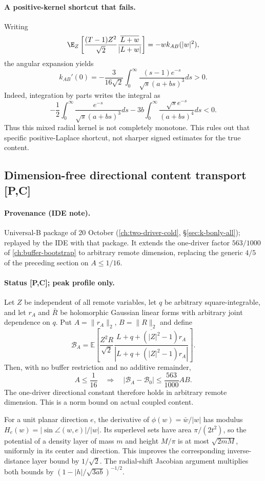 \paragraph{A positive-kernel shortcut that fails.}
Writing
\[
 \E_Z\left[\frac{(T-1)Z^2}{\sqrt2}
 \frac{\overline{L+w}}{|L+w|}\right]=-w k_{AB}(|w|^2),
\]
the angular expansion yields
\[
 k_{AB}'(0)=-\frac3{16\sqrt2}\int_0^\infty
 \frac{(s-1)e^{-s}}{\sqrt s(a+bs)^3}ds>0.
\]
Indeed, integration by parts writes the integral as
\[
 -\frac12\int_0^\infty\frac{e^{-s}}{\sqrt s(a+bs)^3}ds
 -3b\int_0^\infty\frac{\sqrt s e^{-s}}{(a+bs)^4}ds<0.
\]
Thus this mixed radial kernel is not completely monotone. This rules
out that specific positive-Laplace shortcut, not sharper signed
estimates for the true content.

\subsection{Dimension-free directional content transport [P,C]}\label{sec:directional-transport-dimfree}
\paragraph{Provenance (IDE note).} Universal-B package of 20 October (\autoref{ch:two-driver-cold}, \S\ref{sec:k-bonly-all}); replayed by the IDE with that package. It extends the one-driver factor $563/1000$ of \autoref{ch:buffer-bootstrap} to arbitrary remote dimension, replacing the generic $4/5$ of the preceding section on $A\le1/16$.
\paragraph{Status [P,C]; peak profile only.}
Let $Z$ be independent of all remote variables, let $q$ be arbitrary
square-integrable, and let $r_A$ and $\bar R$ be holomorphic Gaussian
linear forms with arbitrary joint dependence on $q$. Put
$A=\|r_A\|_2$, $B=\|R\|_2$ and define
\[
 \mathcal B_A=\mathbb E\left[\frac{Z^2R}{\sqrt2}
 \frac{\overline{L+q+(|Z|^2-1)r_A}}{|L+q+(|Z|^2-1)r_A|}\right].
\]
Then, with no buffer restriction and no additive remainder,
\[
 A\le\frac1{16}\quad\Longrightarrow\quad
 |\mathcal B_A-\mathcal B_0|\le\frac{563}{1000}AB.
\]
The one-driver directional constant therefore holds in arbitrary
remote dimension. This is a norm bound on actual coupled content.

For a unit planar direction $e$, the derivative of
$\phi(w)=\bar w/|w|$ has modulus
$H_e(w)=|\sin\angle(w,e)|/|w|$. Its superlevel sets have area
$\pi/(2t^2)$, so the potential of a density layer of mass $m$ and
height $M/\pi$ is at most $\sqrt{2mM}$, uniformly in its center and
direction. This improves the corresponding inverse-distance layer
bound by $1/\sqrt2$. The radial-shift Jacobian argument multiplies
both bounds by $(1-|h|/\sqrt{3ab})^{-1/2}$.

